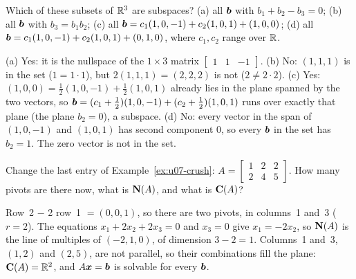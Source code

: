 \begin{exercise}\label{ex:u07-which}
Which of these subsets of $\mathbb{R}^3$ are subspaces? (a) all $\boldsymbol{b}$ with $b_1+b_2-b_3=0$;
(b) all $\boldsymbol{b}$ with $b_3=b_1b_2$; (c) all $\boldsymbol{b}=c_1(1,0,-1)+c_2(1,0,1)+(1,0,0)$;
(d) all $\boldsymbol{b}=c_1(1,0,-1)+c_2(1,0,1)+(0,1,0)$, where $c_1,c_2$ range over $\mathbb{R}$.
\end{exercise}
\begin{solution}
(a) Yes: it is the nullspace of the $1\times3$ matrix $\begin{bmatrix} 1&1&-1\end{bmatrix}$.
(b) No: $(1,1,1)$ is in the set ($1=1\cdot1$), but $2(1,1,1)=(2,2,2)$ is not ($2\neq2\cdot2$).
(c) Yes: $(1,0,0)=\tfrac12(1,0,-1)+\tfrac12(1,0,1)$ already lies in the plane spanned by the two
vectors, so $\boldsymbol{b}=(c_1+\tfrac12)(1,0,-1)+(c_2+\tfrac12)(1,0,1)$ runs over exactly that plane
(the plane $b_2=0$), a subspace.
(d) No: every vector in the span of $(1,0,-1)$ and $(1,0,1)$ has second component $0$, so every
$\boldsymbol{b}$ in the set has $b_2=1$. The zero vector is not in the set.
\end{solution}

\begin{exercise}\label{ex:u07-practice}
Change the last entry of Example~\ref{ex:u07-crush}: $A=\begin{bmatrix} 1&2&2\\ 2&4&5\end{bmatrix}$.
How many pivots are there now, what is $\mathbf{N}(A)$, and what is $\mathbf{C}(A)$?
\end{exercise}
\begin{solution}
Row~2 $-$ 2 row~1 $=(0,0,1)$, so there are two pivots, in columns~1 and~3 ($r=2$). The
equations $x_1+2x_2+2x_3=0$ and $x_3=0$ give $x_1=-2x_2$, so $\mathbf{N}(A)$ is the line of multiples
of $(-2,1,0)$, of dimension $3-2=1$. Columns~1 and~3, $(1,2)$ and $(2,5)$, are not parallel,
so their combinations fill the plane: $\mathbf{C}(A)=\mathbb{R}^2$, and $A\boldsymbol{x}=\boldsymbol{b}$ is solvable for
every $\boldsymbol{b}$.
\end{solution}
